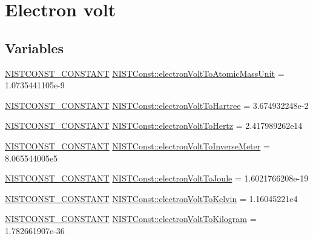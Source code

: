 \hypertarget{group___n_i_s_t_const-_electron_volt}{}\section{Electron volt}
\label{group___n_i_s_t_const-_electron_volt}
\subsection*{Variables}
\begin{DoxyCompactItemize}
\item 
\mbox{\hyperlink{_n_i_s_t_const_8hpp_a2b0fc1d7452373f816175dd86ce26729}{N\+I\+S\+T\+C\+O\+N\+S\+T\+\_\+\+C\+O\+N\+S\+T\+A\+NT}} \mbox{\hyperlink{group___n_i_s_t_const-_electron_volt_ga62eaf49fce099edf5f51c125dc4dd927}{N\+I\+S\+T\+Const\+::electron\+Volt\+To\+Atomic\+Mass\+Unit}} = 1.\+0735441105e-\/9
\item 
\mbox{\hyperlink{_n_i_s_t_const_8hpp_a2b0fc1d7452373f816175dd86ce26729}{N\+I\+S\+T\+C\+O\+N\+S\+T\+\_\+\+C\+O\+N\+S\+T\+A\+NT}} \mbox{\hyperlink{group___n_i_s_t_const-_electron_volt_ga31b4d719efdddf0a302918557df2ea95}{N\+I\+S\+T\+Const\+::electron\+Volt\+To\+Hartree}} = 3.\+674932248e-\/2
\item 
\mbox{\hyperlink{_n_i_s_t_const_8hpp_a2b0fc1d7452373f816175dd86ce26729}{N\+I\+S\+T\+C\+O\+N\+S\+T\+\_\+\+C\+O\+N\+S\+T\+A\+NT}} \mbox{\hyperlink{group___n_i_s_t_const-_electron_volt_gae9b1b225f20da4725294b95a05ea82e0}{N\+I\+S\+T\+Const\+::electron\+Volt\+To\+Hertz}} = 2.\+417989262e14
\item 
\mbox{\hyperlink{_n_i_s_t_const_8hpp_a2b0fc1d7452373f816175dd86ce26729}{N\+I\+S\+T\+C\+O\+N\+S\+T\+\_\+\+C\+O\+N\+S\+T\+A\+NT}} \mbox{\hyperlink{group___n_i_s_t_const-_electron_volt_ga333e07ed95192173791fcf53673f79ef}{N\+I\+S\+T\+Const\+::electron\+Volt\+To\+Inverse\+Meter}} = 8.\+065544005e5
\item 
\mbox{\hyperlink{_n_i_s_t_const_8hpp_a2b0fc1d7452373f816175dd86ce26729}{N\+I\+S\+T\+C\+O\+N\+S\+T\+\_\+\+C\+O\+N\+S\+T\+A\+NT}} \mbox{\hyperlink{group___n_i_s_t_const-_electron_volt_ga214ec0b05df4113393bd1d3e631aebe6}{N\+I\+S\+T\+Const\+::electron\+Volt\+To\+Joule}} = 1.\+6021766208e-\/19
\item 
\mbox{\hyperlink{_n_i_s_t_const_8hpp_a2b0fc1d7452373f816175dd86ce26729}{N\+I\+S\+T\+C\+O\+N\+S\+T\+\_\+\+C\+O\+N\+S\+T\+A\+NT}} \mbox{\hyperlink{group___n_i_s_t_const-_electron_volt_gaaac3cf941012add952f4aee0c72f0a42}{N\+I\+S\+T\+Const\+::electron\+Volt\+To\+Kelvin}} = 1.\+16045221e4
\item 
\mbox{\hyperlink{_n_i_s_t_const_8hpp_a2b0fc1d7452373f816175dd86ce26729}{N\+I\+S\+T\+C\+O\+N\+S\+T\+\_\+\+C\+O\+N\+S\+T\+A\+NT}} \mbox{\hyperlink{group___n_i_s_t_const-_electron_volt_gac875b0f36fd52d70256d4a3d86eebb2e}{N\+I\+S\+T\+Const\+::electron\+Volt\+To\+Kilogram}} = 1.\+782661907e-\/36
\end{DoxyCompactItemize}


